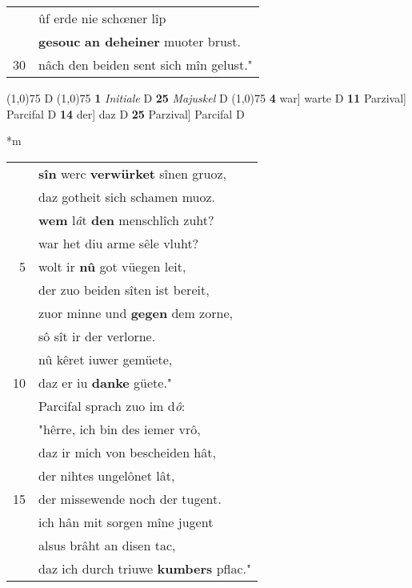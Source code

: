 \documentclass[8pt,a4paper,notitlepage]{article}
\begin{document}
\begin{table}[ht]
\begin{minipage}[t]{0.5\linewidth}
\begin{tabular}{rl}
 & ûf erde nie schœner lîp\\ 
 & \textbf{gesouc} \textbf{an deheiner} muoter brust.\\ 
30 & nâch den beiden sent sich mîn gelust."\\ 
\end{tabular}
\scriptsize
\line(1,0){75} \newline
D \newline
\line(1,0){75} \newline
\textbf{1} \textit{Initiale} D  \textbf{25} \textit{Majuskel} D  \newline
\line(1,0){75} \newline
\textbf{4} war] warte D \textbf{11} Parzival] Parcifal D \textbf{14} der] daz D \textbf{25} Parzival] Parcifal D \newline
\end{minipage}
\hspace{0.5cm}
\begin{minipage}[t]{0.5\linewidth}
\small
\begin{center}*m
\end{center}
\begin{tabular}{rl}
 & \textbf{sîn} werc \textbf{verwürket} sînen gruoz,\\ 
 & daz gotheit sich schamen muoz.\\ 
 & \textbf{wem} l\textit{â}t \textbf{den} menschlîch zuht?\\ 
 & war het diu arme sêle vluht?\\ 
5 & wolt ir \textbf{nû} got vüegen leit,\\ 
 & der zuo beiden sîten ist bereit,\\ 
 & zuor minne und \textbf{gegen} dem zorne,\\ 
 & sô sît ir der verlorne.\\ 
 & nû kêret iuwer gemüete,\\ 
10 & daz er iu \textbf{danke} güete."\\ 
 & Parcifal sprach zuo im d\textit{ô}:\\ 
 & "hêrre, ich bin des iemer vrô,\\ 
 & daz ir mich von  bescheiden hât,\\ 
 & der nihtes ungelônet lât,\\ 
15 & der missewende noch der tugent.\\ 
 & ich hân mit sorgen mîne jugent\\ 
 & alsus brâht an disen tac,\\ 
 & daz ich durch triuwe \textbf{kumbers} pflac."\\ 

\end{tabular}
\end{minipage}
\end{table}
\end{document}
